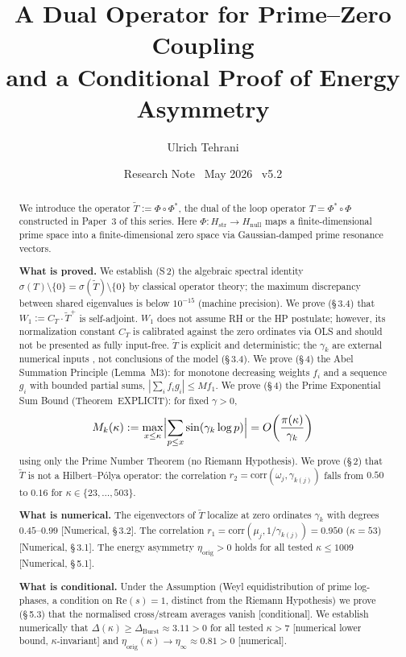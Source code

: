 \documentclass[11pt]{article}
\title{\vspace{-1.5em}\bfseries A Dual Operator for Prime--Zero Coupling\\[0.4em]
\large and a Conditional Proof of Energy Asymmetry}
\author{Ulrich Tehrani}
\date{Research Note \textperiodcentered\ May 2026 \textperiodcentered\ v5.2}
\newcommand{\Hstr}{H_{\mathrm{str}}}
\newcommand{\Hnull}{H_{\mathrm{null}}}
\newcommand{\etaorig}{\eta_{\mathrm{orig}}}
\newcommand{\Tt}{\widetilde{T}}
\newcommand{\CT}{C_{T}}
\newcommand{\Wone}{W_1}
\newcommand{\Dburstvar}{\Delta_{\mathrm{Burst}}}
\begin{document}
\maketitle

\begin{abstract}
We introduce the operator $\Tt := \Phi \circ \Phi^*$,
the dual of the loop operator $T = \Phi^* \circ \Phi$ constructed in Paper~3
of this series. Here $\Phi\colon\Hstr \to \Hnull$ maps a
finite-dimensional prime space into a finite-dimensional zero space via
Gaussian-damped prime resonance vectors.

\textbf{What is proved.}
We establish (S\,2) the algebraic spectral identity
$\sigma(T)\setminus\{0\} = \sigma(\Tt)\setminus\{0\}$
by classical operator theory; the maximum discrepancy between shared
eigenvalues is below $10^{-15}$ (machine precision).
We prove (\S\,3.4) that $\Wone := \CT\cdot\Tt^+$ is self-adjoint.
$\Wone$ does not assume RH or the HP postulate; however, its normalization
constant $\CT$ is calibrated against the zero ordinates via OLS and should
not be presented as fully input-free.
$\Tt$ is explicit and deterministic; the $\gamma_k$ are external numerical
inputs , not conclusions of the model (\S\,3.4).
We prove (\S\,4) the Abel Summation Principle (Lemma~M3):
for monotone decreasing weights $f_i$ and a sequence $g_i$ with bounded
partial sums, $|\sum_i f_i g_i| \leq M f_1$.
We prove (\S\,4) the Prime Exponential Sum Bound
(Theorem~EXPLICIT): for fixed $\gamma > 0$,
\[
M_k(\kappa) := \max_{x \leq \kappa}\Bigl|\sum_{p \leq x}\sin(\gamma_k\log p)\Bigr|
= O\!\left(\frac{\pi(\kappa)}{\gamma_k}\right)
\]
using only the Prime Number Theorem (no Riemann Hypothesis).
We prove (\S\,2) that $\Tt$ is not a
Hilbert--P\'olya operator: the correlation
$r_2 = \mathrm{corr}(\omega_j,\gamma_{k(j)})$
falls from $0.50$ to $0.16$ for $\kappa\in\{23,\ldots,503\}$.

\textbf{What is numerical.}
The eigenvectors of $\Tt$ localize at zero ordinates $\gamma_k$
with degrees $0.45$--$0.99$ [Numerical, \S\,3.2].
The correlation $r_1 = \mathrm{corr}(\mu_j,1/\gamma_{k(j)}) = 0.950$
($\kappa=53$) [Numerical, \S\,3.1].
The energy asymmetry $\etaorig > 0$ holds for all tested $\kappa\leq 1009$
[Numerical, \S\,5.1].

\textbf{What is conditional.}
Under the Assumption (Weyl equidistribution of prime log-phases,
a condition on $\mathrm{Re}(s)=1$, distinct from the Riemann
Hypothesis) we prove (\S\,5.3) that the normalised cross/stream
averages vanish [conditional].
We establish numerically that
$\Delta(\kappa)\geq\Dburstvar\approx 3.11 > 0$ for all tested $\kappa > 7$
[numerical lower bound, $\kappa$-invariant] and
$\etaorig(\kappa)\to\eta_\infty\approx 0.81 > 0$ [numerical].


\end{abstract}
\end{document}
